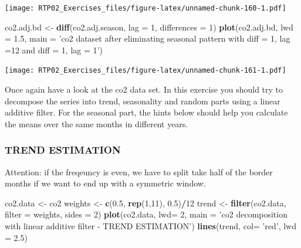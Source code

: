 \documentclass[
]{article}
\newenvironment{Shaded}{\begin{snugshade}}{\end{snugshade}}
\newcommand{\DataTypeTok}[1]{\textcolor[rgb]{0.13,0.29,0.53}{#1}}
\newcommand{\DecValTok}[1]{\textcolor[rgb]{0.00,0.00,0.81}{#1}}
\newcommand{\FloatTok}[1]{\textcolor[rgb]{0.00,0.00,0.81}{#1}}
\newcommand{\KeywordTok}[1]{\textcolor[rgb]{0.13,0.29,0.53}{\textbf{#1}}}
\newcommand{\NormalTok}[1]{#1}
\newcommand{\OperatorTok}[1]{\textcolor[rgb]{0.81,0.36,0.00}{\textbf{#1}}}
\newcommand{\StringTok}[1]{\textcolor[rgb]{0.31,0.60,0.02}{#1}}
\begin{document}
\texttt{[image: RTP02\_Exercises\_files/figure-latex/unnamed-chunk-160-1.pdf]}

\begin{Shaded}
\begin{Highlighting}[]
\NormalTok{co2.adj.bd <-}\StringTok{ }\KeywordTok{diff}\NormalTok{(co2.adj.season, }\DataTypeTok{lag =} \DecValTok{1}\NormalTok{, }\DataTypeTok{differences =} \DecValTok{1}\NormalTok{)}
\KeywordTok{plot}\NormalTok{(co2.adj.bd, }\DataTypeTok{lwd =} \FloatTok{1.5}\NormalTok{, }\DataTypeTok{main =} \StringTok{'co2 dataset after eliminating seasonal pattern with diff = 1, lag =12 and diff = 1, lag = 1'}\NormalTok{)}
\end{Highlighting}
\end{Shaded}

\texttt{[image: RTP02\_Exercises\_files/figure-latex/unnamed-chunk-161-1.pdf]}

Once again have a look at the co2 data set. In this exercise you should
try to decompose the series into trend, seasonality and random parts
using a linear additive filter. For the seasonal part, the hints below
should help you calculate the means over the same months in different
years.

\hypertarget{trend-estimation}{%
\subsubsection{TREND ESTIMATION}\label{trend-estimation}}

Attention: if the freqeuncy is even, we have to split take half of the
border months if we want to end up with a symmetric window.

\begin{Shaded}
\begin{Highlighting}[]
\NormalTok{co2.data <-}\StringTok{ }\NormalTok{co2}
\NormalTok{weights <-}\StringTok{ }\KeywordTok{c}\NormalTok{(}\FloatTok{0.5}\NormalTok{, }\KeywordTok{rep}\NormalTok{(}\DecValTok{1}\NormalTok{,}\DecValTok{11}\NormalTok{), }\FloatTok{0.5}\NormalTok{)}\OperatorTok{/}\DecValTok{12}
\NormalTok{trend <-}\StringTok{ }\KeywordTok{filter}\NormalTok{(co2.data, }\DataTypeTok{filter =}\NormalTok{ weights, }\DataTypeTok{sides =} \DecValTok{2}\NormalTok{)}
\KeywordTok{plot}\NormalTok{(co2.data, }\DataTypeTok{lwd=} \DecValTok{2}\NormalTok{, }\DataTypeTok{main =} \StringTok{'co2 decomposition with linear additive filter - TREND ESTIMATION'}\NormalTok{)}
\KeywordTok{lines}\NormalTok{(trend, }\DataTypeTok{col=} \StringTok{'red'}\NormalTok{, }\DataTypeTok{lwd =} \FloatTok{2.5}\NormalTok{)}
\end{Highlighting}
\end{Shaded}
\end{document}
